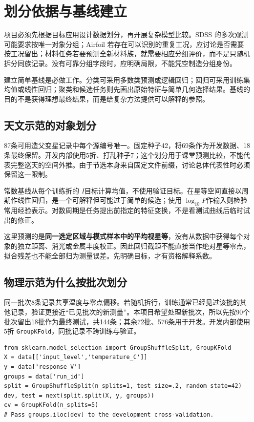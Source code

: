 \section{划分依据与基线建立}
项目必须先根据目标应用设计数据划分，再开展复杂模型比较。SDSS 的多次观测可能要求按唯一对象分组；Airfoil 若存在可以识别的重复工况，应讨论是否需要按工况留出；材料任务若要预测全新材料族，就需要相应分组评价，而不是只随机拆分同族记录。没有可靠分组字段时，应明确局限，不能凭空制造分组身份。

建立简单基线是必做工作。分类可采用多数类预测或逻辑回归；回归可采用训练集均值或线性回归；聚类和候选任务则先画出原始特征与简单几何选择结果。基线的目的不是获得理想最终结果，而是给复杂方法提供可以解释的参照。

\subsection{天文示范的对象划分}
87条可用造父变星记录中每个源编号唯一。固定种子42，将69条作为开发数据、18条最终保留。开发内部使用5折、打乱种子7；这个划分用于课堂预测比较，不能代表完整巡天的空间外推。由于节选本身来自固定文件前缀，讨论总体代表性时必须保留这一限制。

常数基线从每个训练折的 $I$目标计算均值，不使用验证目标。在星等空间直接以周期作线性回归，是一个可解释但可能过于简单的候选；使用 $\log_{10}P$作输入则检验常用经验表示。对数周期是任务提出前指定的特征变换，不是看测试曲线后临时试出的修正。

这里预测的是\textbf{同一选定区域与模式样本中的平均视星等}，没有从数据中获得每个对象的独立距离、消光或金属丰度校正。因此回归截距不能直接当作绝对星等零点，拟合残差也不能全部归为测量误差。先明确目标，才有资格解释系数。

\subsection{物理示范为什么按批次划分}
同一批次8条记录共享温度与零点偏移。若随机拆行，训练通常已经见过该批的其他记录，验证更接近“已见批次的新测量”。本项目希望处理新批次，所以先按90个批次留出18批作为最终测试，共144条；其余72批、576条用于开发。开发内部使用5折 \texttt{GroupKFold}，同批记录不跨训练与验证。

\begin{lstlisting}[caption={标定项目先保留整个批次，再做分组交叉验证}]
from sklearn.model_selection import GroupShuffleSplit, GroupKFold
X = data[['input_level','temperature_C']]
y = data['response_V']
groups = data['run_id']
split = GroupShuffleSplit(n_splits=1, test_size=.2, random_state=42)
dev, test = next(split.split(X, y, groups))
cv = GroupKFold(n_splits=5)
# Pass groups.iloc[dev] to the development cross-validation.
\end{lstlisting}

